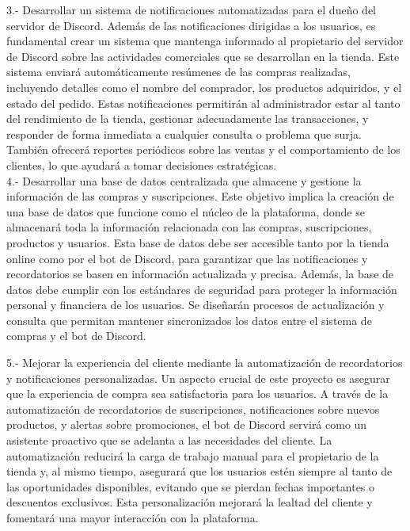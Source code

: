 \documentclass[a4paper,12pt]{article}
\begin{document}
3.- Desarrollar un sistema de notificaciones automatizadas para el dueño del servidor de Discord.
Además de las notificaciones dirigidas a los usuarios, es fundamental crear un sistema que mantenga informado al propietario del servidor de Discord sobre las actividades comerciales que se desarrollan en la tienda. Este sistema enviará automáticamente resúmenes de las compras realizadas, incluyendo detalles como el nombre del comprador, los productos adquiridos, y el estado del pedido. Estas notificaciones permitirán al administrador estar al tanto del rendimiento de la tienda, gestionar adecuadamente las transacciones, y responder de forma inmediata a cualquier consulta o problema que surja. También ofrecerá reportes periódicos sobre las ventas y el comportamiento de los clientes, lo que ayudará a tomar decisiones estratégicas.\\

4.- Desarrollar una base de datos centralizada que almacene y gestione la información de las compras y suscripciones.
Este objetivo implica la creación de una base de datos que funcione como el núcleo de la plataforma, donde se almacenará toda la información relacionada con las compras, suscripciones, productos y usuarios. Esta base de datos debe ser accesible tanto por la tienda online como por el bot de Discord, para garantizar que las notificaciones y recordatorios se basen en información actualizada y precisa. Además, la base de datos debe cumplir con los estándares de seguridad para proteger la información personal y financiera de los usuarios. Se diseñarán procesos de actualización y consulta que permitan mantener sincronizados los datos entre el sistema de compras y el bot de Discord.\\
\newpage

5.- Mejorar la experiencia del cliente mediante la automatización de recordatorios y notificaciones personalizadas.
Un aspecto crucial de este proyecto es asegurar que la experiencia de compra sea satisfactoria para los usuarios. A través de la automatización de recordatorios de suscripciones, notificaciones sobre nuevos productos, y alertas sobre promociones, el bot de Discord servirá como un asistente proactivo que se adelanta a las necesidades del cliente. La automatización reducirá la carga de trabajo manual para el propietario de la tienda y, al mismo tiempo, asegurará que los usuarios estén siempre al tanto de las oportunidades disponibles, evitando que se pierdan fechas importantes o descuentos exclusivos. Esta personalización mejorará la lealtad del cliente y fomentará una mayor interacción con la plataforma.\\
\end{document}
